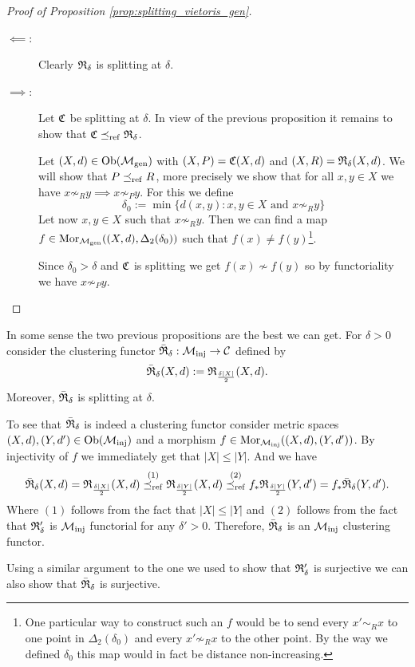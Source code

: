 \begin{proof}[Proof of Proposition \ref{prop:splitting_vietoris_gen}]
    \begin{description}
        \item[$\impliedby$:] Clearly $\mathfrak{R}_\delta$ is splitting at $\delta$.
        \item[$\implies$:] Let $\mathfrak{C}$ be splitting at $\delta$. In view of the previous proposition it remains to show that $\mathfrak{C} \preceq_\mathrm{ref} \mathfrak{R}_\delta$.
        
        Let $(X,d) \in \mathrm {Ob}({\mathcal{M}_\mathrm{gen}})$ with $(X,P) = \mathfrak{C}(X,d)$ and $(X,R) = \mathfrak{R}_\delta(X,d)$. We will show that $P \preceq_\mathrm{ref} R$, more precisely we show that for all $x,y \in X$ we have $x \not\sim_R y \implies x \not\sim_P y$. For this we define
        $$
        \delta_0 := \min\{d(x,y): x,y \in X \text{ and } x \not\sim_R y\}
        $$
        Let now $x,y \in X$ such that $x \not\sim_R y$.
        Then we can find a map $f \in \mathrm {Mor}_{\mathcal{M}_\mathrm{gen}}((X,d), \Delta_2(\delta_0))$ such that $f(x) \neq f(y)$\footnote{One particular way to construct such an $f$ would be to send every $x' \sim_R x$ to one point in $\Delta_2(\delta_0)$ and every $x' \not\sim_R x$ to the other point. By the way we defined $\delta_0$ this map would in fact be distance non-increasing.}.

        Since $\delta_0 > \delta$ and $\mathfrak{C}$ is splitting we get $f(x) \not\sim f(y)$ so by functoriality we have $x \not\sim_P y$.
    \end{description}
\end{proof}

\begin{example}{}{}
In some sense the two previous propositions are the best we can get. For $\delta>0$ consider the clustering functor $\bar{\mathfrak{R}}_\delta: {\mathcal{M}_\mathrm{inj}} \to \mathcal{C}$ defined by
$$
\bar{\mathfrak{R}}_\delta(X,d) := \mathfrak{R}_{\frac{\delta|X|}{2}}(X,d).
$$
Moreover, $\bar{\mathfrak{R}}_\delta$ is splitting at $\delta$.

\medskip
To see that $\bar{\mathfrak{R}}_\delta$ is indeed a clustering functor consider metric spaces $(X,d), (Y,d') \in \mathrm {Ob}({\mathcal{M}_\mathrm{inj}})$ and a morphism $f \in \mathrm {Mor}_{\mathcal{M}_\mathrm{inj}}((X,d), (Y,d'))$. By injectivity of $f$ we immediately get that $|X| \le |Y|$. And we have
$$
\bar{\mathfrak{R}}_\delta(X,d) = \mathfrak{R}_{\frac{\delta|X|}{2}}(X,d) \overset{(1)}{\preceq_\mathrm{ref}} \mathfrak{R}_{\frac{\delta|Y|}{2}}(X,d) \overset{(2)}{\preceq_\mathrm{ref}} f_*\mathfrak{R}_{\frac{\delta|Y|}{2}}(Y,d') = f_*\bar{\mathfrak{R}}_\delta(Y,d').
$$
Where $(1)$ follows from the fact that $|X| \le |Y|$ and $(2)$ follows from the fact that $\mathfrak{R}_\delta'$ is ${\mathcal{M}_\mathrm{inj}}$ functorial for any $\delta' > 0$. Therefore, $\bar{\mathfrak{R}}_\delta$ is an ${\mathcal{M}_\mathrm{inj}}$ clustering functor.

\medskip
Using a similar argument to the one we used to show that $\mathfrak{R}_\delta'$ is surjective we can also show that $\bar{\mathfrak{R}}_\delta$ is surjective.

\end{example}

